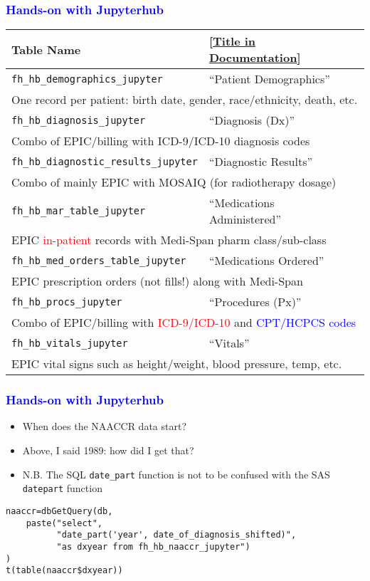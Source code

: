 \documentclass[11pt,pdftex,dvipsnames,usenames]{beamer}
\begin{document}
\begin{frame}[fragile]\frametitle{\bf\textcolor{blue}{Hands-on with Jupyterhub}}
\begin{tabular}{lll}
Table Name & 
\textcolor{PineGreen}{[\href{https://ctri.mcw.edu/wp-content/uploads/CTSI-Honest-Broker-Data-Dictionary.pdf}{Title in Documentation}]} \\ \hline
\texttt{fh\_hb\_demographics\_jupyter}       & ``Patient Demographics'' \\ 
\multicolumn{3}{l}{One record per patient: birth date, gender, 
race/ethnicity, death, etc.} \\ \hline 
\texttt{fh\_hb\_diagnosis\_jupyter}          & ``Diagnosis (Dx)'' \\
\multicolumn{3}{l}{Combo of EPIC/billing with ICD-9/ICD-10 
diagnosis codes} \\  \hline  
\texttt{fh\_hb\_diagnostic\_results\_jupyter}& ``Diagnostic Results'' \\
\multicolumn{3}{l}{Combo of mainly EPIC with MOSAIQ (for radiotherapy dosage)} \\  \hline  
\texttt{fh\_hb\_mar\_table\_jupyter}         & ``Medications Administered''\\
\multicolumn{3}{l}{EPIC \textcolor{red}{in-patient} records with Medi-Span pharm class/sub-class} \\   \hline 
\texttt{fh\_hb\_med\_orders\_table\_jupyter} & ``Medications Ordered'' \\
\multicolumn{3}{l}{EPIC prescription orders (not fills!) along with Medi-Span} \\  \hline  
\texttt{fh\_hb\_procs\_jupyter}              & ``Procedures (Px)'' \\
\multicolumn{3}{l}{Combo of EPIC/billing with 
\textcolor{red}{ICD-9/ICD-10} 
and \textcolor{blue}{CPT/HCPCS codes}} \\  \hline  
\texttt{fh\_hb\_vitals\_jupyter}             & ``Vitals'' \\
\multicolumn{3}{l}{EPIC vital signs such as height/weight, blood pressure,
temp, etc. } \\   \hline 
\end{tabular}
\end{frame}


\begin{frame}[fragile]\frametitle{\bf\textcolor{blue}{Hands-on with Jupyterhub}}
\begin{itemize}
\item When does the NAACCR data start?
\item Above, I said 1989: how did I get that?
\item N.B. The SQL \texttt{date\_part} function is not to be confused with 
the SAS \texttt{datepart} function
\end{itemize}
\begin{verbatim}
naaccr=dbGetQuery(db, 
    paste("select",
          "date_part('year', date_of_diagnosis_shifted)",
          "as dxyear from fh_hb_naaccr_jupyter")
)
t(table(naaccr$dxyear))
\end{verbatim}
\end{frame}
\end{document}
